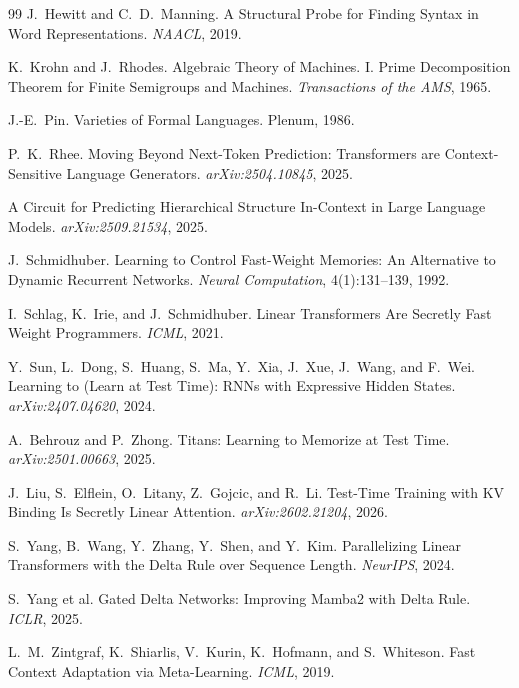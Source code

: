 \documentclass[11pt, a4paper]{article}
\theoremstyle{plain}
\theoremstyle{definition}
\theoremstyle{remark}
\begin{document}
\begin{thebibliography}{99}
J.~Hewitt and C.~D.~Manning.
\newblock A Structural Probe for Finding Syntax in Word Representations.
\newblock \emph{NAACL}, 2019.

K.~Krohn and J.~Rhodes.
\newblock Algebraic Theory of Machines. {I}. Prime Decomposition Theorem for Finite Semigroups and Machines.
\newblock \emph{Transactions of the AMS}, 1965.

J.-E.~Pin.
\newblock Varieties of Formal Languages.
\newblock Plenum, 1986.

P.~K.~Rhee.
\newblock Moving Beyond Next-Token Prediction: Transformers are Context-Sensitive Language Generators.
\newblock \emph{arXiv:2504.10845}, 2025.

A Circuit for Predicting Hierarchical Structure In-Context in Large Language Models.
\newblock \emph{arXiv:2509.21534}, 2025.

J.~Schmidhuber.
\newblock Learning to Control Fast-Weight Memories: An Alternative to Dynamic Recurrent Networks.
\newblock \emph{Neural Computation}, 4(1):131--139, 1992.

I.~Schlag, K.~Irie, and J.~Schmidhuber.
\newblock Linear Transformers Are Secretly Fast Weight Programmers.
\newblock \emph{ICML}, 2021.

Y.~Sun, L.~Dong, S.~Huang, S.~Ma, Y.~Xia, J.~Xue, J.~Wang, and F.~Wei.
\newblock Learning to (Learn at Test Time): RNNs with Expressive Hidden States.
\newblock \emph{arXiv:2407.04620}, 2024.

A.~Behrouz and P.~Zhong.
\newblock Titans: Learning to Memorize at Test Time.
\newblock \emph{arXiv:2501.00663}, 2025.

J.~Liu, S.~Elflein, O.~Litany, Z.~Gojcic, and R.~Li.
\newblock Test-Time Training with KV Binding Is Secretly Linear Attention.
\newblock \emph{arXiv:2602.21204}, 2026.

S.~Yang, B.~Wang, Y.~Zhang, Y.~Shen, and Y.~Kim.
\newblock Parallelizing Linear Transformers with the Delta Rule over Sequence Length.
\newblock \emph{NeurIPS}, 2024.

S.~Yang et al.
\newblock Gated Delta Networks: Improving Mamba2 with Delta Rule.
\newblock \emph{ICLR}, 2025.

L.~M.~Zintgraf, K.~Shiarlis, V.~Kurin, K.~Hofmann, and S.~Whiteson.
\newblock Fast Context Adaptation via Meta-Learning.
\newblock \emph{ICML}, 2019.


\end{thebibliography}
\end{document}
